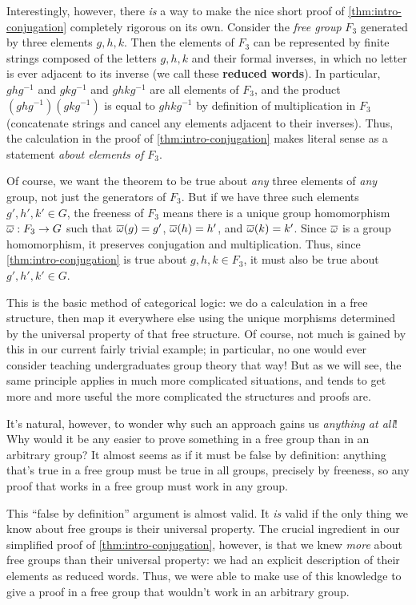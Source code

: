 Interestingly, however, there \emph{is} a way to make the nice short proof of \cref{thm:intro-conjugation} completely rigorous on its own.
Consider the \emph{free group} $F_3$ generated by three elements $g,h,k$.
Then the elements of $F_3$ can be represented by finite strings composed of the letters $g,h,k$ and their formal inverses, in which no letter is ever adjacent to its inverse (we call these \textbf{reduced words}).
In particular, $g h g^{-1}$ and $g k g^{-1}$ and $g h k g^{-1}$ are all elements of $F_3$, and the product $(g h g^{-1})(g k g^{-1})$ is equal to $g h k g^{-1}$ by definition of multiplication in $F_3$ (concatenate strings and cancel any elements adjacent to their inverses).
Thus, the calculation in the proof of \cref{thm:intro-conjugation} makes literal sense as a statement \emph{about elements of $F_3$}.

Of course, we want the theorem to be true about \emph{any} three elements of \emph{any} group, not just the generators of $F_3$.
But if we have three such elements $g', h', k'\in G$, the freeness of $F_3$ means there is a unique group homomorphism $\overline{\omega}:F_3 \to G$ such that $\overline{\omega}(g) = g'$, $\overline{\omega}(h)=h'$, and $\overline{\omega}(k)=k'$.
Since $\overline{\omega}$ is a group homomorphism, it preserves conjugation and multiplication.
Thus, since \cref{thm:intro-conjugation} is true about $g,h,k\in F_3$, it must also be true about $g',h',k'\in G$.

This is the basic method of categorical logic: we do a calculation in a free structure, then map it everywhere else using the unique morphisms determined by the universal property of that free structure.
Of course, not much is gained by this in our current fairly trivial example; in particular, no one would ever consider teaching undergraduates group theory that way!
But as we will see, the same principle applies in much more complicated situations, and tends to get more and more useful the more complicated the structures and proofs are.

It's natural, however, to wonder why such an approach gains us \emph{anything at all}!
Why would it be any easier to prove something in a free group than in an arbitrary group?
It almost seems as if it must be false by definition: anything that's true in a free group must be true in all groups, precisely by freeness, so any proof that works in a free group must work in any group.

This ``false by definition'' argument is almost valid.
It \emph{is} valid if the only thing we know about free groups is their universal property.
The crucial ingredient in our simplified proof of \cref{thm:intro-conjugation}, however, is that we knew \emph{more} about free groups than their universal property: we had an explicit description of their elements as reduced words.
Thus, we were able to make use of this knowledge to give a proof in a free group that wouldn't work in an arbitrary group.

